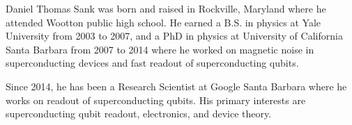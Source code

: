 \documentclass[journal]{IEEEtran}
\begin{document}
\begin{IEEEbiography}{Daniel Thomas Sank} was born and raised in Rockville, Maryland where he attended Wootton public high school. He earned a B.S. in physics at Yale University from 2003 to 2007, and a PhD in physics at University of California Santa Barbara from 2007 to 2014 where he worked on magnetic noise in superconducting devices and fast readout of superconducting qubits.

Since 2014, he has been a Research Scientist at Google Santa Barbara where he works on readout of superconducting qubits. His primary interests are superconducting qubit readout, electronics, and device theory.


\end{IEEEbiography}
\end{document}
